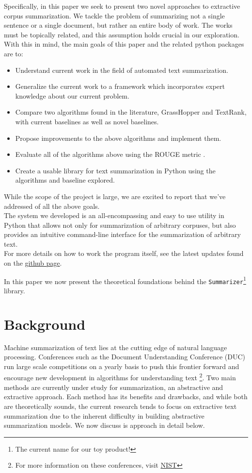 \documentclass[10pt]{article}
\begin{document}
Specifically, in this paper we seek to present two novel approaches to extractive corpus summarization. We tackle the problem of summarizing not a single sentence or a single document, but rather an entire body of work. The works must be topically related, and this assumption holds crucial in our exploration. With this in mind, the main goals of this paper and the related python packages are to:
\begin{itemize}
\item Understand current work in the field of automated text summarization.
\item Generalize the current work to a framework which incorporates expert knowledge about our current problem.
\item Compare two algorithms found in the literature, GrassHopper and TextRank, with current baselines as well as novel baselines.
\item Propose improvements to the above algorithms and implement them.
\item Evaluate all of the algorithms above using the ROUGE metric \cite{rouge}.
\item Create a usable library for text summarization in Python using the algorithms and baseline explored.
\end{itemize}

While the scope of the project is large, we are excited to report that we've addressed of all the above goals.\\

The system we developed is an all-encompassing and easy to use utility in Python that allows not only for summarization of arbitrary corpuses, but also provides an intuitive command-line interface for the summarization of arbitrary text. \\

For more details on how to work the program itself, see the latest updates found on the \href{https://github.com/kandluis/document_summaries}{github page}.

In this paper we now present the theoretical foundations behind the \verb|Summarizer|\footnote{The current name for our toy product!} library.

\section{Background}
Machine summarization of text lies at the cutting edge of natural language processing. Conferences such as the Document Understanding Conference (DUC) run large scale competitions on a yearly basis to push this frontier forward and encourage new development in algorithms for understanding text \footnote{For more information on these conferences, visit \href{http://duc.nist.gov/}{NIST}}. Two main methods are currently under study for summarization, an abstractive and extractive approach. Each method has its benefits and drawbacks, and while both are theoretically sounds, the current research tends to focus on extractive text summarization due to the inherent difficulty in building abstractive summarization models. We now discuss is approach in detail below.
\end{document}
